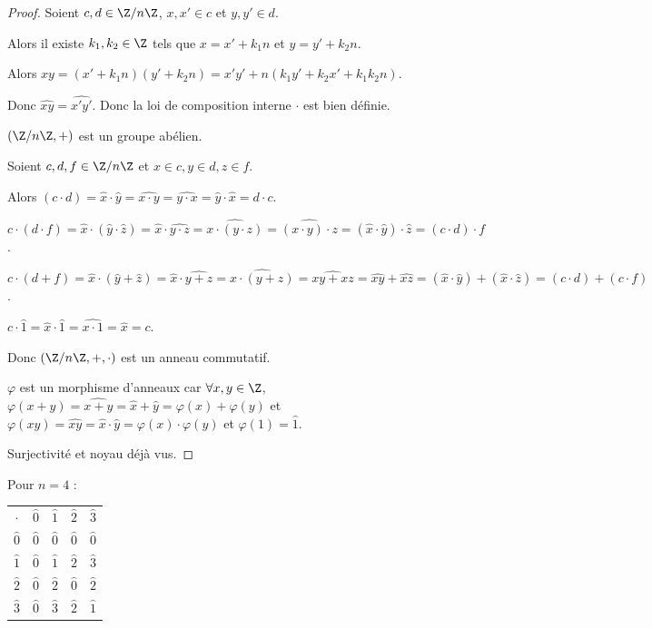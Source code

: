 \begin{proof}
    Soient $c, d \in \Z / n \Z$, $x, x' \in c$ et $y, y' \in d$. 

    Alors il existe $k_1, k_2 \in \Z$ tels que $x = x' + k_1 n$ et $y = y' + k_2 n$.

    Alors $xy = (x' + k_1 n)(y' + k_2 n) = x'y' + n(k_1 y' + k_2 x' + k_1 k_2 n)$.

    Donc $\widehat{xy} = \widehat{x'y'}$. Donc la loi de composition interne $\cdot$ est bien définie.

    \avspace $(\Z / n \Z, +)$ est un groupe abélien.

    \avspace Soient $c, d, f \in \Z / n \Z$ et $x \in c, y \in d, z \in f$.

    Alors $(c \cdot d) = \widehat{x} \cdot \widehat{y} = \widehat{x \cdot y} = \widehat{y \cdot x} = \widehat{y} \cdot \widehat{x} = d \cdot c$.

    $c \cdot (d \cdot f) = \widehat{x} \cdot (\widehat{y} \cdot \widehat{z}) = \widehat{x} \cdot \widehat{y \cdot z} = \widehat{x \cdot (y \cdot z)} = \widehat{(x \cdot y) \cdot z} = (\widehat{x} \cdot \widehat{y}) \cdot \widehat{z} = (c \cdot d) \cdot f$.

    $c \cdot (d + f) = \widehat{x} \cdot (\widehat{y} + \widehat{z}) = \widehat{x} \cdot \widehat{y + z} = \widehat{x \cdot (y + z)} = \widehat{xy + xz} = \widehat{xy} + \widehat{xz} = (\widehat{x} \cdot \widehat{y}) + (\widehat{x} \cdot \widehat{z}) = (c \cdot d) + (c \cdot f)$.

    $c \cdot \widehat{1} = \widehat{x} \cdot \widehat{1} = \widehat{x \cdot 1} = \widehat{x} = c$.

    Donc $(\Z / n \Z, +, \cdot)$ est un anneau commutatif.

    \avspace $\varphi$ est un morphisme d'anneaux car $\forall x, y \in \Z$, 
    $\varphi(x + y) = \widehat{x + y} = \widehat{x} + \widehat{y} = \varphi(x) + \varphi(y)$ et 
    $\varphi(xy) = \widehat{xy} = \widehat{x} \cdot \widehat{y} = \varphi(x) \cdot \varphi(y)$ et 
    $\varphi(1) = \widehat{1}$.
    
    Surjectivité et noyau déjà vus.
\end{proof}

\begin{exemple}
    Pour $n = 4$ :
        \begin{center}
        \begin{tabular}{ccccc}
            \toprule
            $\cdot$ & $\widehat{0}$ & $\widehat{1}$ & $\widehat{2}$ & $\widehat{3}$ \\
            $\hat 0$ & $\hat 0$ & $\hat 0$ & $\hat 0$ & $\hat 0$\\
            $\hat 1$ & $\hat 0$ & $\hat 1$ & $\hat 2$ & $\hat 3$ \\
            $\hat 2$ & $\hat 0$ & $\hat 2$ & $\hat 0$ & $\hat 2$ \\
            $\hat 3$ & $\hat 0$ & $\hat 3$ & $\hat 2$ & $\hat 1$ \\
            \bottomrule
        \end{tabular}
        \end{center}
\end{exemple}

